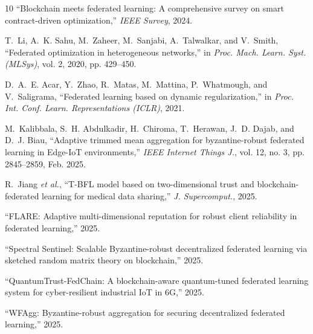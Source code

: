 \documentclass[12pt,a4paper,onecolumn]{article}
\begin{document}
\begin{thebibliography}{10}
``Blockchain meets federated learning: A comprehensive survey on smart contract-driven optimization,''
\emph{IEEE Survey}, 2024.

T.~Li, A.~K. Sahu, M.~Zaheer, M.~Sanjabi, A.~Talwalkar, and V.~Smith,
``Federated optimization in heterogeneous networks,''
in \emph{Proc. Mach. Learn. Syst. (MLSys)}, vol. 2, 2020, pp. 429--450.

D.~A.~E. Acar, Y.~Zhao, R.~Matas, M.~Mattina, P.~Whatmough, and V.~Saligrama,
``Federated learning based on dynamic regularization,''
in \emph{Proc. Int. Conf. Learn. Representations (ICLR)}, 2021.

M.~Kalibbala, S.~H. Abdulkadir, H.~Chiroma, T.~Herawan, J.~D. Dajab, and D.~J. Biau,
``Adaptive trimmed mean aggregation for byzantine-robust federated learning in Edge-IoT environments,''
\emph{IEEE Internet Things J.}, vol. 12, no. 3, pp. 2845--2859, Feb. 2025.

R.~Jiang \emph{et al.},
``T-BFL model based on two-dimensional trust and blockchain-federated learning for medical data sharing,''
\emph{J. Supercomput.}, 2025.

``FLARE: Adaptive multi-dimensional reputation for robust client reliability in federated learning,'' 2025.

``Spectral Sentinel: Scalable Byzantine-robust decentralized federated learning via sketched random matrix theory on blockchain,'' 2025.

``QuantumTrust-FedChain: A blockchain-aware quantum-tuned federated learning system for cyber-resilient industrial IoT in 6G,'' 2025.

``WFAgg: Byzantine-robust aggregation for securing decentralized federated learning,'' 2025.

\end{thebibliography}
\end{document}
